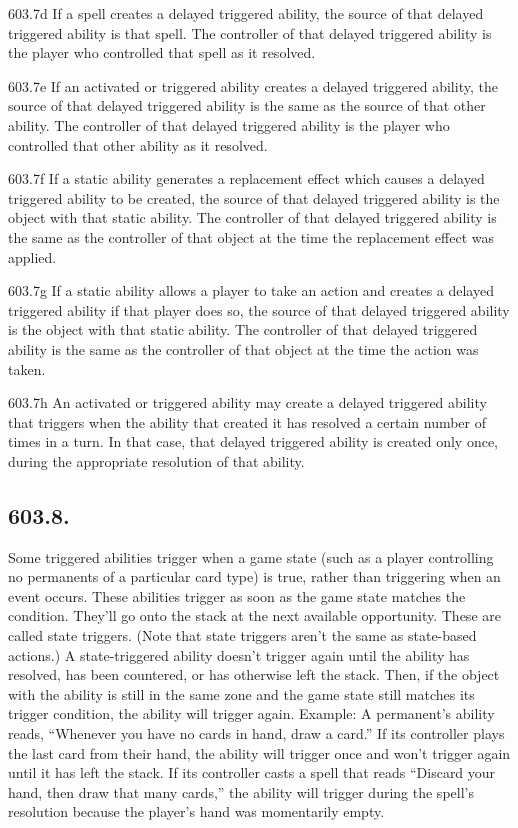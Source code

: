 603.7d If a spell creates a delayed triggered ability, the source of that delayed triggered ability is that spell. The controller of that delayed triggered ability is the player who controlled that spell as it resolved.

603.7e If an activated or triggered ability creates a delayed triggered ability, the source of that delayed triggered ability is the same as the source of that other ability. The controller of that delayed triggered ability is the player who controlled that other ability as it resolved.

603.7f If a static ability generates a replacement effect which causes a delayed triggered ability to be created, the source of that delayed triggered ability is the object with that static ability. The controller of that delayed triggered ability is the same as the controller of that object at the time the replacement effect was applied.

603.7g If a static ability allows a player to take an action and creates a delayed triggered ability if that player does so, the source of that delayed triggered ability is the object with that static ability. The controller of that delayed triggered ability is the same as the controller of that object at the time the action was taken.

603.7h An activated or triggered ability may create a delayed triggered ability that triggers when the ability that created it has resolved a certain number of times in a turn. In that case, that delayed triggered ability is created only once, during the appropriate resolution of that ability.

\subsection*{603.8.}
Some triggered abilities trigger when a game state (such as a player controlling no permanents of a particular card type) is true, rather than triggering when an event occurs. These abilities trigger as soon as the game state matches the condition. They’ll go onto the stack at the next available opportunity. These are called state triggers. (Note that state triggers aren’t the same as state-based actions.) A state-triggered ability doesn’t trigger again until the ability has resolved, has been countered, or has otherwise left the stack. Then, if the object with the ability is still in the same zone and the game state still matches its trigger condition, the ability will trigger again.
Example: A permanent’s ability reads, “Whenever you have no cards in hand, draw a card.” If its controller plays the last card from their hand, the ability will trigger once and won’t trigger again until it has left the stack. If its controller casts a spell that reads “Discard your hand, then draw that many cards,” the ability will trigger during the spell’s resolution because the player’s hand was momentarily empty.

